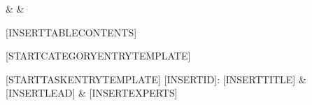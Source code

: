 
\hline
{} &  & \\
\hline

[INSERTTABLECONTENTS]

[STARTCATEGORYENTRYTEMPLATE]
\\ \hline
[ENDCATEGORYENTRYTEMPLATE]

[STARTTASKENTRYTEMPLATE]
[INSERTID]: {[INSERTTITLE]} & [INSERTLEAD] & [INSERTEXPERTS]\\ \hline
[ENDTASKENTRYTEMPLATE]
